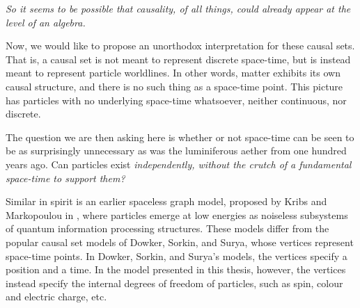 \documentclass[letterpaper,12pt,titlepage,oneside,final]{book}
\begin{document}
\it So it seems to be possible that causality, of all things,
could already appear at the level of an algebra. \rm

\medskip

Now, we would like to propose an unorthodox interpretation for these causal sets.  That is, a causal set is not meant to represent discrete space-time, but is instead meant to represent particle worldlines.  In other words, matter exhibits its own causal structure, and there is no such thing as a space-time point.  This picture has particles with no underlying space-time whatsoever, neither continuous, nor discrete.  

The question we are then asking here is whether or not space-time can be seen to be as surprisingly unnecessary as was the luminiferous aether from one hundred years ago.  Can particles exist \it independently, \rm without the crutch of a fundamental space-time to support them?  



Similar in spirit is an earlier spaceless  graph model, proposed by Kribs and Markopoulou in \cite{km}, where particles emerge at low energies as noiseless subsystems of quantum information processing structures.  
These models differ from the popular causal set models of Dowker, Sorkin, and Surya, whose vertices represent space-time points.  In Dowker,  Sorkin, and Surya's models, the vertices specify a position and a time.  In the model presented in this thesis, however, the vertices instead specify the internal degrees of freedom of particles, such as spin, colour and electric charge, etc.  

\end{document}
